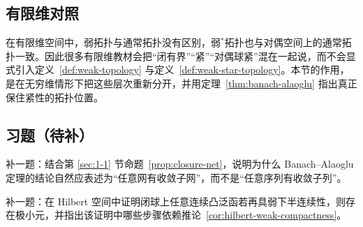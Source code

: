 \subsection*{有限维对照}

在有限维空间中，弱拓扑与通常拓扑没有区别，弱$^\ast$拓扑也与对偶空间上的通常拓扑一致。因此很多有限维教材会把“闭有界”“紧”“对偶球紧”混在一起说，而不会显式引入定义~\ref{def:weak-topology} 与定义~\ref{def:weak-star-topology}。本节的作用，是在无穷维情形下把这些层次重新分开，并用定理~\ref{thm:banach-alaoglu} 指出真正保住紧性的拓扑位置。

\subsection*{习题（待补）}

\begin{exercise}[弱拓扑与网占位]\label{exr:weak-topology-net-placeholder}
补一题：结合第 \ref{sec:1-1} 节命题~\ref{prop:closure-net}，说明为什么 Banach--Alaoglu 定理的结论自然应表述为“任意网有收敛子网”，而不是“任意序列有收敛子列”。
\end{exercise}

\begin{exercise}[直接法桥接题占位]\label{exr:direct-method-placeholder}
补一题：在 Hilbert 空间中证明闭球上任意连续凸泛函若再具弱下半连续性，则存在极小元，并指出该证明中哪些步骤依赖推论~\ref{cor:hilbert-weak-compactness}。
\end{exercise}
